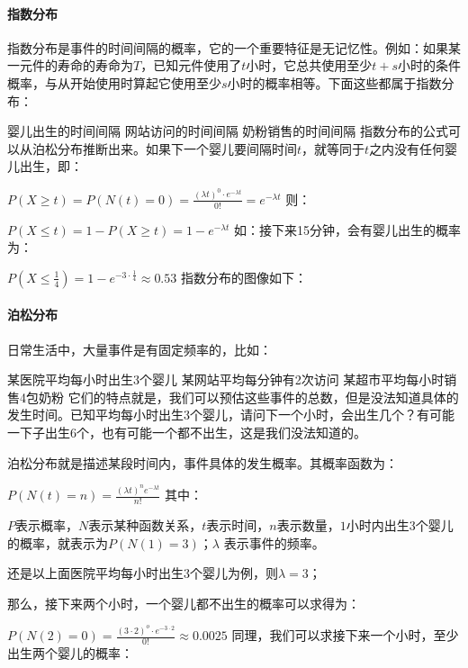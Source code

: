 \documentclass[11pt]{book}
\newcounter{#2}
\newcounter{#2}[#1]
\numberwithin{#2}{#1}
\begin{document}
\paragraph{指数分布}

指数分布是事件的时间间隔的概率，它的一个重要特征是无记忆性。例如：如果某一元件的寿命的寿命为$ T $，已知元件使用了$ t $小时，它总共使用至少$ t+s $小时的条件概率，与从开始使用时算起它使用至少$ s $小时的概率相等。下面这些都属于指数分布：

婴儿出生的时间间隔
网站访问的时间间隔
奶粉销售的时间间隔 
指数分布的公式可以从泊松分布推断出来。如果下一个婴儿要间隔时间$ t $，就等同于$ t $之内没有任何婴儿出生，即：

$ P\left( X\geq t \right) =P\left( N\left( t \right) =0 \right) =\frac{\left( \lambda t \right) ^{0}\cdot e^{-\lambda t}  }{0!}=e^{-\lambda t} $ 
则：

$ P\left( X\leq t \right) =1-P\left( X\geq t \right) =1-e^{-\lambda t}  $
如：接下来15分钟，会有婴儿出生的概率为：

$ P\left( X\leq \frac{1}{4} \right) =1-e^{-3\cdot \frac{1}{4} } \approx 0.53 $
指数分布的图像如下：


\paragraph{泊松分布}

日常生活中，大量事件是有固定频率的，比如：

某医院平均每小时出生3个婴儿
某网站平均每分钟有2次访问
某超市平均每小时销售4包奶粉 
它们的特点就是，我们可以预估这些事件的总数，但是没法知道具体的发生时间。已知平均每小时出生3个婴儿，请问下一个小时，会出生几个？有可能一下子出生6个，也有可能一个都不出生，这是我们没法知道的。

泊松分布就是描述某段时间内，事件具体的发生概率。其概率函数为：

$ P\left( N\left( t \right) =n \right) =\frac{\left( \lambda t \right) ^{n}e^{-\lambda t}  }{n!}  $
其中：

$ P $表示概率，$ N $表示某种函数关系，$ t $表示时间，$ n $表示数量，$ 1 $小时内出生3个婴儿的概率，就表示为$  P(N(1) = 3)  $；$ λ $ 表示事件的频率。

还是以上面医院平均每小时出生3个婴儿为例，则$ \lambda =3 $；

那么，接下来两个小时，一个婴儿都不出生的概率可以求得为：

$ P\left( N\left(2 \right) =0 \right) =\frac{\left( 3\cdot 2 \right) ^{o} \cdot e^{-3\cdot 2} }{0!} \approx 0.0025 $
同理，我们可以求接下来一个小时，至少出生两个婴儿的概率：
\end{document}
